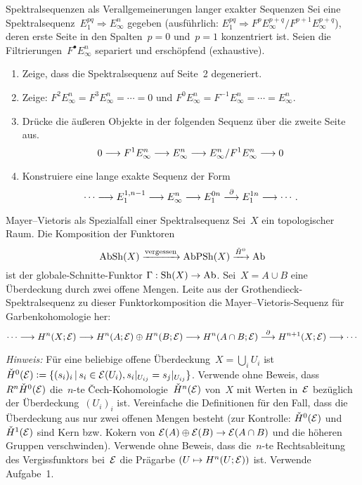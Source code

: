 \documentclass{uebblatt}
\begin{document}

\begin{aufgabe}{Spektralsequenzen als Verallgemeinerungen langer exakter Sequenzen}
Sei eine Spektralsequenz~$E_1^{pq} \Rightarrow E^n_\infty$ gegeben
(ausführlich: $E_1^{pq} \Rightarrow F^p
E^{p+q}_\infty/F^{p+1}E^{p+q}_\infty$), deren erste
Seite in den Spalten~$p = 0$ und~$p = 1$ konzentriert ist. Seien die
Filtrierungen~$F^\bullet E^n_\infty$ separiert und erschöpfend (exhaustive).
\begin{enumerate}
\item Zeige, dass die Spektralsequenz auf Seite~2 degeneriert.
\item Zeige: $F^2 E^n_\infty = F^3 E^n_\infty = \cdots = 0$ und
$F^0 E^n_\infty = F^{-1} E^n_\infty = \cdots = E^n_\infty$.
\item Drücke die äußeren Objekte in der folgenden Sequenz über
die zweite Seite aus.
\[ 0 \longrightarrow F^1 E^n_\infty \longrightarrow E^n_\infty \longrightarrow E^n_\infty/F^1 E^n_\infty \longrightarrow 0 \]
\vspace{-1.8em}
\item Konstruiere eine lange exakte Sequenz der Form
\[ \cdots \longrightarrow E^{1,n-1}_1 \longrightarrow E^n_\infty \longrightarrow E^{0n}_1
\stackrel{\partial}{\longrightarrow} E^{1n}_1 \longrightarrow \cdots. \]
\end{enumerate}
\vspace{-1em}
\end{aufgabe}

\begin{aufgabe}{Mayer--Vietoris als Spezialfall einer Spektralsequenz}
Sei~$X$ ein topologischer Raum. Die Komposition der Funktoren
\[ \mathrm{AbSh}(X) \xrightarrow{\text{vergessen}} \mathrm{AbPSh}(X)
  \xrightarrow{\check H^0} \mathrm{Ab} \]
ist der globale-Schnitte-Funktor $\Gamma : \mathrm{Sh}(X) \to \mathrm{Ab}$. Sei~$X = A \cup B$
eine Überdeckung durch zwei offene Mengen. Leite aus der
Grothendieck-Spektralsequenz zu dieser Funktorkomposition die
Mayer--Vietoris-Sequenz für Garbenkohomologie her:
\[ \cdots \longrightarrow H^n(X; \mathcal{E}) \longrightarrow
  H^n(A; \mathcal{E}) \oplus H^n(B; \mathcal{E}) \longrightarrow
  H^n(A \cap B; \mathcal{E}) \stackrel{\partial}{\longrightarrow} H^{n+1}(X; \mathcal{E}) \longrightarrow \cdots \]
{\tiny\emph{Hinweis:} Für eine beliebige offene Überdeckung~$X = \bigcup_i U_i$
ist~$\check H^0(\mathcal{E}) \vcentcolon= \{ (s_i)_i \,|\, s_i \in \mathcal{E}(U_i), s_i|_{U_{ij}} =
s_j|_{U_{ij}} \}$. Verwende ohne Beweis, dass~$R^n \check H^0(\mathcal{E})$
die~$n$-te Čech-Kohomologie~$\check H^n(\mathcal{E})$ von~$X$ mit Werten in~$\mathcal{E}$ bezüglich der
Überdeckung~$(U_i)_i$ ist. Vereinfache die Definitionen für den Fall, dass die
Überdeckung aus nur zwei offenen Mengen besteht (zur Kontrolle: $\check
H^0(\mathcal{E})$ und~$\check H^1(\mathcal{E})$ sind Kern bzw. Kokern von $\mathcal{E}(A) \oplus \mathcal{E}(B) \to
\mathcal{E}(A \cap B)$ und die höheren Gruppen verschwinden). Verwende ohne Beweis, dass
die~$n$-te Rechtsableitung des Vergissfunktors bei~$\mathcal{E}$ die Prägarbe $(U
\mapsto H^n(U; \mathcal{E}))$ ist. Verwende Aufgabe~1.\par}
\end{aufgabe}
\end{document}
